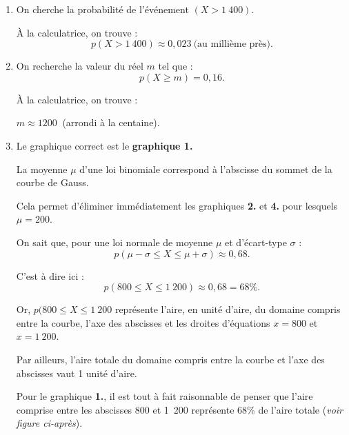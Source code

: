 \begin{corrige}
     \par
     \begin{enumerate}
          \item %
          On cherche la probabilité de l'événement $(X>1~400)$.
          \par
          \`A la calculatrice, on trouve :
          \[ p(X>1~400) \approx 0,023\ \text{(au millième près)}. \]
          \par
          \item %
          On recherche la valeur du réel $m$ tel que :
          \[ p(X \geqslant m) = 0,16. \]
          \par
          \`A la calculatrice, on trouve :
          \par
          $m \approx 1200\ $ (arrondi à la centaine).
          \item %
          Le graphique correct est le \textbf{graphique 1.}
          \par
          La moyenne $\mu$ d'une loi binomiale correspond à l'abscisse du sommet de la courbe de Gauss.
          \par
          Cela permet d'éliminer immédiatement les graphiques \textbf{2.} et \textbf{4.} pour lesquels $\mu =200$.
          \par
          On sait que, pour une loi normale de moyenne $\mu$ et d'écart-type $\sigma$ :
          \[ p(\mu -\sigma \leqslant X \leqslant\mu +\sigma ) \approx 0,68. \]
          \par
          C'est à dire ici :
          \[ p(800 \leqslant X \leqslant 1\ 200 ) \approx 0,68 = 68\%. \]
          \par
          Or, $p(800 \leqslant X \leqslant 1\ 200$ représente l'aire, en unité d'aire, du domaine compris entre la courbe, l'axe des abscisses et les droites d'équations $x=800$ et $x=1\ 200$.
          \par
          Par ailleurs, l'aire totale du domaine compris entre la courbe et l'axe des abscisses vaut 1 unité d'aire.
          \par
          Pour le graphique \textbf{1.}, il est tout à fait raisonnable de penser que l'aire comprise entre les abscisses 800 et 1\ 200 représente 68\% de l'aire totale (\textit{voir figure ci-après}).
\begin{center}
\end{center}


\end{enumerate}
\end{corrige}
